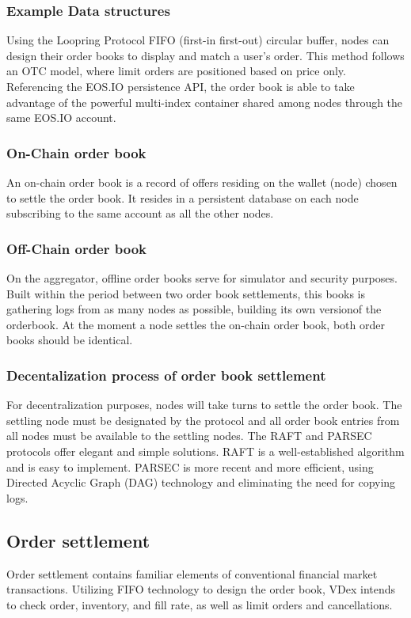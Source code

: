 \documentclass[]{article}
\begin{document}
{\subsubsection{Example Data structures}

Using the Loopring Protocol FIFO (first-in first-out) circular buffer, nodes can design their order books to display and match a user’s order. This method follows an OTC model, where limit orders are positioned based on price only. \cite{7}  
Referencing the EOS.IO persistence API, the order book is able to take advantage of the powerful multi-index container shared among nodes through the same EOS.IO account.



\subsubsection{On-Chain order book}
An on-chain order book is a record of offers residing on the wallet (node) chosen to settle the order book. It resides in a persistent database on each node subscribing to the same account as all the other nodes.

\subsubsection{Off-Chain order book}
On the aggregator, offline order books serve for simulator and security purposes.
Built within the period between two order book settlements, this books is gathering logs from as many nodes as possible, 
building its own versionof the orderbook. At the moment a node settles the on-chain order book, both order books should be identical.
 
 
 
\subsubsection{Decentalization process of order book settlement}
For decentralization purposes, nodes will take turns to settle the order book. 
The settling node must be designated by the protocol and all order book entries from all nodes must be available to the settling nodes. 
The RAFT\cite{18} and PARSEC\cite{23} protocols offer elegant and simple solutions. 
RAFT is a well-established algorithm and is easy to implement. PARSEC is more recent and more efficient, using Directed Acyclic Graph (DAG) technology and eliminating the need for copying logs.

\subsection{Order settlement}
Order settlement contains familiar elements of conventional financial market transactions. Utilizing FIFO technology to design the order book, VDex intends to check order, inventory, and fill rate, as well as limit orders and cancellations. 

}
\end{document}
